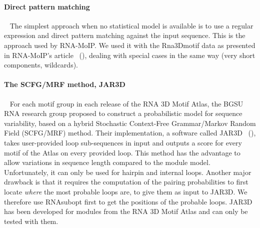 \documentclass{bioinfo}
\begin{document}
\begin{methods}
\paragraph{Direct pattern matching} ~ The simplest approach when no statistical model is available is to use a regular expression and direct pattern matching against the input sequence. This is the approach used by RNA-MoIP. We used it with the Rna3Dmotif data as presented in RNA-MoIP's article ~(\citealp{reinharz_towards_2012}), dealing with special cases in the same way (very short components, wildcards).

\paragraph{The SCFG/MRF method, JAR3D} ~ For each motif group in each release of the RNA 3D Motif Atlas, the BGSU RNA research group proposed to construct a probabilistic model for sequence variability, based on a hybrid Stochastic Context-Free Grammar/Markov Random Field (SCFG/MRF) method. Their implementation, a software called JAR3D ~(\citealp{zirbel_identifying_2015}), takes user-provided loop sub-sequences in input and outputs a score for every motif of the Atlas on every provided loop. This method has the advantage to allow variations in sequence length compared to the module model. Unfortunately, it can only be used for hairpin and internal loops. Another major drawback is that it requires the computation of the pairing probabilities to first locate \textit{where} the most probable loops are, to give them as input to JAR3D. We therefore use RNAsubopt first to get the positions of the probable loops. JAR3D has been developed for modules from the RNA 3D Motif Atlas and can only be tested with them.


\end{methods}
\end{document}
